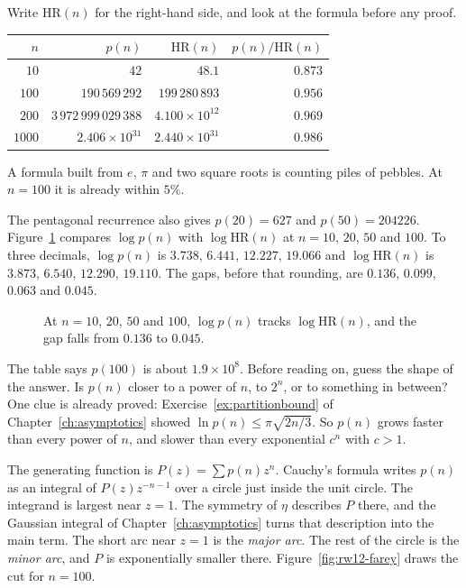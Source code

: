Write $\mathrm{HR}(n)$ for the right-hand side, and look at the formula before any proof.

\begin{center}
\begin{tabular}{rrrr}
$n$ & $p(n)$ & $\mathrm{HR}(n)$ & $p(n)/\mathrm{HR}(n)$\\\hline
$10$ & $42$ & $48.1$ & $0.873$\\
$100$ & $190\,569\,292$ & $199\,280\,893$ & $0.956$\\
$200$ & $3\,972\,999\,029\,388$ & $4.100\times10^{12}$ & $0.969$\\
$1000$ & $2.406\times10^{31}$ & $2.440\times10^{31}$ & $0.986$
\end{tabular}
\end{center}

A formula built from $e$, $\pi$ and two square roots is counting piles of pebbles. At $n=100$ it is already within $5\%$.

The pentagonal recurrence also gives $p(20)=627$ and $p(50)=204226$. Figure~\ref{fig:rw12-logp} compares $\log p(n)$ with $\log\mathrm{HR}(n)$ at $n=10$, $20$, $50$ and $100$. To three decimals, $\log p(n)$ is $3.738$, $6.441$, $12.227$, $19.066$ and $\log\mathrm{HR}(n)$ is $3.873$, $6.540$, $12.290$, $19.110$. The gaps, before that rounding, are $0.136$, $0.099$, $0.063$ and $0.045$.

\begin{figure}[ht]
\centering
{}
\caption{At $n=10$, $20$, $50$ and $100$, $\log p(n)$ tracks $\log\mathrm{HR}(n)$, and the gap falls from $0.136$ to $0.045$.}
\label{fig:rw12-logp}
\end{figure}

\begin{think}
The table says $p(100)$ is about $1.9\times10^8$. Before reading on, guess the shape of the answer. Is $p(n)$ closer to a power of $n$, to $2^n$, or to something in between? One clue is already proved: Exercise~\ref{ex:partitionbound} of Chapter~\ref{ch:asymptotics} showed $\ln p(n)\le\pi\sqrt{2n/3}$. So $p(n)$ grows faster than every power of $n$, and slower than every exponential $c^n$ with $c>1$.
\end{think}

The generating function is $P(z)=\sum p(n)z^n$. Cauchy's formula writes $p(n)$ as an integral of $P(z)z^{-n-1}$ over a circle just inside the unit circle. The integrand is largest near $z=1$. The symmetry of $\eta$ describes $P$ there, and the Gaussian integral of Chapter~\ref{ch:asymptotics} turns that description into the main term. The short arc near $z=1$ is the \emph{major arc}. The rest of the circle is the \emph{minor arc}, and $P$ is exponentially smaller there. Figure~\ref{fig:rw12-farey} draws the cut for $n=100$.

